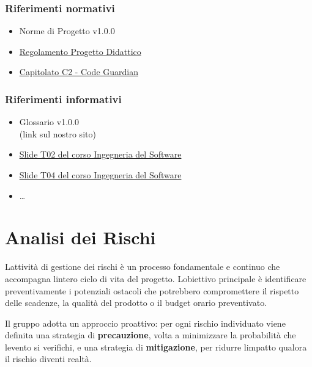 \documentclass[12pt, a4paper]{article}
\begin{document}
\subsubsection{Riferimenti normativi}

\begin{itemize}
\item
  Norme di Progetto v1.0.0
\item  
  \href{https://www.math.unipd.it/~tullio/IS-1/2025/Dispense/PD1.pdf}{Regolamento Progetto Didattico}
\item
  \href{https://www.math.unipd.it/~tullio/IS-1/2025/Progetto/C2.pdf}{Capitolato C2 - Code Guardian}
\end{itemize}

\subsubsection{Riferimenti informativi}

\begin{itemize}
\item
  Glossario v1.0.0\\
  (link sul nostro sito)
\item
  \href{https://www.math.unipd.it/~tullio/IS-1/2025/Dispense/T02.pdf}{Slide T02 del corso Ingegneria del Software}
\item
  \href{https://www.math.unipd.it/~tullio/IS-1/2025/Dispense/T04.pdf}{Slide T04 del corso Ingegneria del Software}
\item
  \ldots{}
\end{itemize}

\section{Analisi dei Rischi}

L\textquotesingle attività di gestione dei rischi è un processo
fondamentale e continuo che accompagna l\textquotesingle intero ciclo di
vita del progetto. L\textquotesingle obiettivo principale è identificare
preventivamente i potenziali ostacoli che potrebbero compromettere il
rispetto delle scadenze, la qualità del prodotto o il budget orario
preventivato.

Il gruppo adotta un approccio proattivo: per ogni rischio individuato
viene definita una strategia di \textbf{precauzione}, volta a
minimizzare la probabilità che l\textquotesingle evento si verifichi, e
una strategia di \textbf{mitigazione}, per ridurre
l\textquotesingle impatto qualora il rischio diventi realtà.
\end{document}
